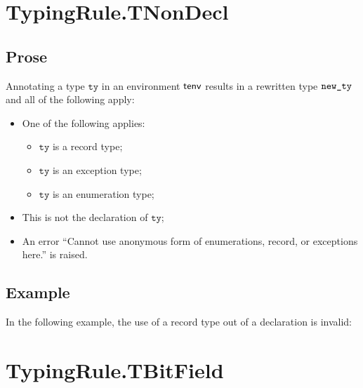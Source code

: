 \documentclass{book}
\newcommand\tty[0]{\texttt{ty}}
\begin{document}




\section{TypingRule.TNonDecl \label{sec:TypingRule.TNonDecl}}

\subsection{Prose}
Annotating a type $\tty$ in an environment $\textsf{tenv}$ results in a
rewritten type $\texttt{new\_ty}$ and all of the following apply:
\begin{itemize}
  \item One of the following applies:
    \begin{itemize}
      \item $\tty$ is a record type;
      \item $\tty$ is an exception type;
      \item $\tty$ is an enumeration type;
    \end{itemize}
  \item This is not the declaration of $\tty$;
  \item An error ``Cannot use anonymous form of enumerations, record, or exceptions here.'' is raised.
\end{itemize}

\subsection{Example}

In the following example, the use of a record type out of a declaration is invalid:






\section{TypingRule.TBitField \label{sec:TypingRule.TBitField}}
\end{document}
